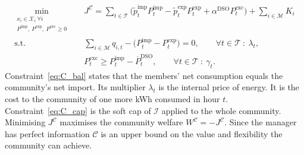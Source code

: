 \begin{subequations}\label{eq:C}
\begin{align}
\min_{\substack{x_i\in\mathcal{X}_i\ \forall i\\ P^{\mathrm{imp}},\ P^{\mathrm{exp}},\ P^{\mathrm{exc}}\ge 0}}\quad & J^{\mathcal{C}}=\sum_{t\in\mathcal{T}}\Big(\tilde{p}^{\mathrm{imp}}_t P^{\mathrm{imp}}_t-\tilde{p}^{\mathrm{exp}}_t P^{\mathrm{exp}}_t+\alpha^{\mathrm{DSO}}P^{\mathrm{exc}}_t\Big)+\sum_{i\in\mathcal{M}}K_i \label{eq:C_obj}\\
\text{s.t.}\quad & \textstyle\sum_{i\in\mathcal{M}}q_{i,t}-\big(P^{\mathrm{imp}}_t-P^{\mathrm{exp}}_t\big)=0, \qquad \forall t\in\mathcal{T}\ :\ \lambda_t, \label{eq:C_bal}\\
& P^{\mathrm{exc}}_t\ge P^{\mathrm{imp}}_t-\overline{P}^{\mathrm{DSO}}_t, \qquad \forall t\in\mathcal{T}\ :\ \gamma_t. \label{eq:C_cap}
\end{align}
\end{subequations}
Constraint~\eqref{eq:C_bal} states that the members' net consumption equals the community's net import.
Its multiplier $\lambda_t$ is the internal price of energy.
It is the cost to the community of one more kWh consumed in hour $t$.
Constraint~\eqref{eq:C_cap} is the soft cap of $\mathcal{I}$ applied to the whole community.
Minimising $J^{\mathcal{C}}$ maximises the community welfare $W^{\mathcal{C}}=-J^{\mathcal{C}}$.
Since the manager has perfect information $\mathcal{C}$ is an upper bound on the value and flexibility the community can achieve.




